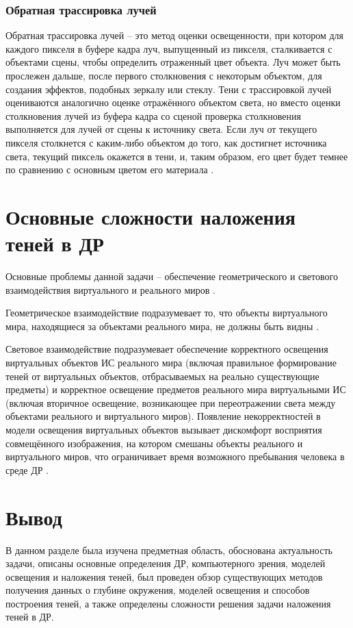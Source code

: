 \subsubsection*{Обратная трассировка лучей}

Обратная трассировка лучей -- это метод оценки освещенности, при котором для каждого пикселя в буфере кадра луч, выпущенный из пикселя, сталкивается с объектами сцены, чтобы определить отраженный цвет объекта. Луч может быть прослежен дальше, после первого столкновения с некоторым объектом, для создания эффектов, подобных зеркалу или стеклу. Тени с трассировкой лучей оцениваются аналогично оценке отражённого объектом света, но вместо оценки столкновения лучей из буфера кадра со сценой проверка столкновения выполняется для лучей от сцены к источнику света. Если луч от текущего пикселя столкнется с каким-либо объектом до того, как достигнет источника света, текущий пиксель окажется в тени, и, таким образом, его цвет будет темнее по сравнению с основным цветом его материала \cite{engel2008programming}.

\section{Основные сложности наложения теней в ДР}

Основные проблемы данной задачи -- обеспечение геометрического и светового взаимодействия виртуального и реального миров \cite{sns_tras}.

Геометрическое взаимодействие подразумевает то, что объекты виртуального мира, находящиеся за объектами реального мира, не должны быть видны \cite{sns_tras}.

Световое взаимодействие подразумевает обеспечение корректного освещения виртуальных объектов ИС реального мира (включая правильное формирование теней от виртуальных объектов, отбрасываемых на реально существующие предметы) и корректное освещение предметов реального мира виртуальными ИС (включая вторичное освещение, возникающее при переотражении света между объектами реального и виртуального миров). Появление некорректностей в модели освещения виртуальных объектов вызывает дискомфорт восприятия совмещённого изображения, на котором  смешаны объекты реального и виртуального миров, что ограничивает время возможного пребывания человека в среде ДР \cite{sns_tras}.

\section*{Вывод}

В данном разделе была изучена предметная область, обоснована актуальность задачи, описаны основные определения ДР, компьютерного зрения, моделей освещения и наложения теней, был проведен обзор существующих методов получения данных о глубине окружения, моделей освещения и способов построения теней, а также определены сложности решения задачи наложения теней в ДР.